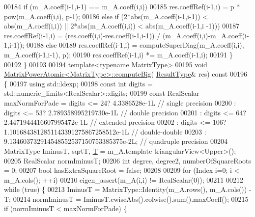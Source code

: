 \begin{DoxyCode}
00184     \textcolor{keywordflow}{if} (m\_A.coeff(i-1,i-1) == m\_A.coeff(i,i))
00185       res.coeffRef(i-1,i) = p * pow(m\_A.coeff(i,i), p-1);
00186     \textcolor{keywordflow}{else} \textcolor{keywordflow}{if} (2*abs(m\_A.coeff(i-1,i-1)) < abs(m\_A.coeff(i,i)) || 2*abs(m\_A.coeff(i,i)) < abs(m\_A.coeff(i-1,i
      -1)))
00187       res.coeffRef(i-1,i) = (res.coeff(i,i)-res.coeff(i-1,i-1)) / (m\_A.coeff(i,i)-m\_A.coeff(i-1,i-1));
00188     \textcolor{keywordflow}{else}
00189       res.coeffRef(i-1,i) = computeSuperDiag(m\_A.coeff(i,i), m\_A.coeff(i-1,i-1), p);
00190     res.coeffRef(i-1,i) *= m\_A.coeff(i-1,i);
00191   \}
00192 \}
00193 
00194 \textcolor{keyword}{template}<\textcolor{keyword}{typename} MatrixType>
00195 \textcolor{keywordtype}{void} \hyperlink{class_eigen_1_1_matrix_power_atomic}{MatrixPowerAtomic<MatrixType>::computeBig}(
      \hyperlink{group___core___module_class_eigen_1_1_block}{ResultType}& res)\textcolor{keyword}{ const}
00196 \textcolor{keyword}{}\{
00197   \textcolor{keyword}{using} std::ldexp;
00198   \textcolor{keyword}{const} \textcolor{keywordtype}{int} digits = std::numeric\_limits<RealScalar>::digits;
00199   \textcolor{keyword}{const} RealScalar maxNormForPade = digits <=  24? 4.3386528e-1L                            \textcolor{comment}{// single
       precision}
00200                                   : digits <=  53? 2.789358995219730e-1L                    \textcolor{comment}{// double
       precision}
00201                                   : digits <=  64? 2.4471944416607995472e-1L                \textcolor{comment}{// extended
       precision}
00202                                   : digits <= 106? 1.1016843812851143391275867258512e-1L    \textcolor{comment}{//
       double-double}
00203                                   :                9.134603732914548552537150753385375e-2L; \textcolor{comment}{// quadruple
       precision}
00204   MatrixType IminusT, sqrtT, \hyperlink{group___sparse_core___module}{T} = m\_A.template triangularView<Upper>();
00205   RealScalar normIminusT;
00206   \textcolor{keywordtype}{int} degree, degree2, numberOfSquareRoots = 0;
00207   \textcolor{keywordtype}{bool} hasExtraSquareRoot = \textcolor{keyword}{false};
00208 
00209   \textcolor{keywordflow}{for} (Index i=0; i < m\_A.cols(); ++i)
00210     eigen\_assert(m\_A(i,i) != RealScalar(0));
00211 
00212   \textcolor{keywordflow}{while} (\textcolor{keyword}{true}) \{
00213     IminusT = MatrixType::Identity(m\_A.rows(), m\_A.cols()) - T;
00214     normIminusT = IminusT.cwiseAbs().colwise().sum().maxCoeff();
00215     \textcolor{keywordflow}{if} (normIminusT < maxNormForPade) \{

\end{DoxyCode}

